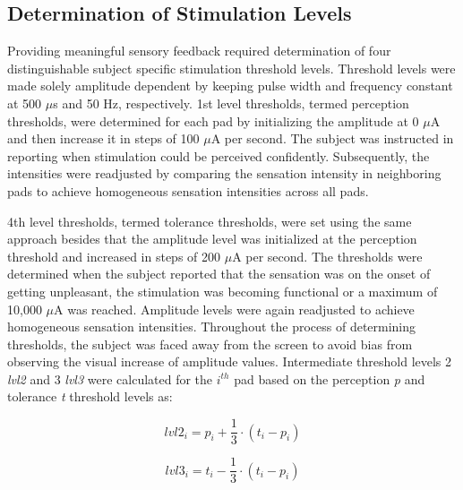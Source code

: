 
\subsection{Determination of Stimulation Levels}


Providing meaningful sensory feedback required determination of four distinguishable subject specific stimulation threshold levels. Threshold levels were made solely amplitude dependent by keeping pulse width and frequency constant at 500 $\mu$s and 50 Hz, respectively.  1st level thresholds, termed perception thresholds, were determined for each pad by initializing the amplitude at 0 $\mu$A and then increase it in steps of 100 $\mu$A per second. The subject was instructed in reporting when stimulation could be perceived confidently. Subsequently, the intensities were readjusted by comparing the sensation intensity in neighboring pads to achieve homogeneous sensation intensities across all pads. 

4th level thresholds, termed tolerance thresholds, were set using the same approach besides that the amplitude level was initialized at the perception threshold and increased in steps of 200 $\mu $A per second. The thresholds were determined when the subject reported that the sensation was on the onset of getting unpleasant, the stimulation was becoming functional or a maximum of 10,000 $\mu$A was reached. Amplitude levels were again readjusted to achieve homogeneous sensation intensities. Throughout the process of determining thresholds, the subject was faced away from the screen to avoid bias from observing the visual increase of amplitude values. Intermediate threshold levels 2 \textit{lvl2} and 3 \textit{lvl3} were calculated for the $i^{th}$ pad based on the perception \textit{p} and tolerance \textit{t} threshold levels as: 

	\begin{equation}
	lvl2_i = p_i + \frac{1}{3} \cdot (t_i - p_i)
	\end{equation}

	\begin{equation}
	lvl3_i = t_i - \frac{1}{3} \cdot (t_i - p_i)
	\end{equation}
